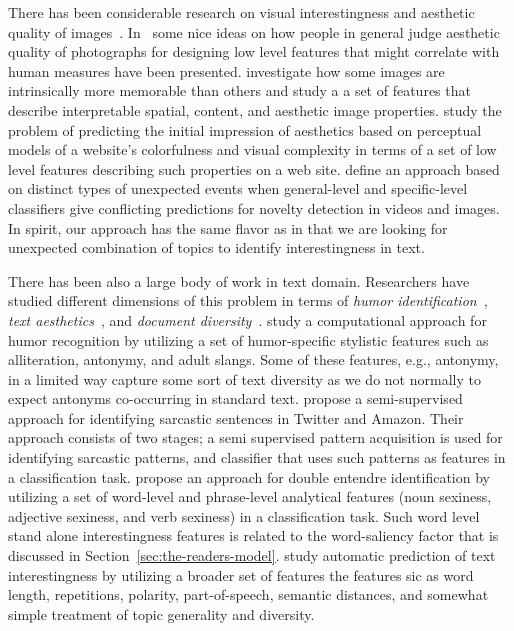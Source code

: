 There has been considerable research on visual interestingness and aesthetic quality of images~\cite{Datta:2006:SAP:2129560.2129588,Datta:2008:4233023,Ke:2006:DHF:1153170.1153495,IsolaParikhTorralbaOliva2011,dhar:2011,reinecke2013predicting,journals/pami/WeinshallZHKOABGNPHP12,journals/pami/WeinshallZHKOABGNPHP12}. In~\cite{Datta:2006:SAP:2129560.2129588,Datta:2008:4233023,Ke:2006:DHF:1153170.1153495,dhar:2011} some nice ideas on how people in general judge aesthetic quality of photographs for designing low level features that might correlate with human measures have been presented. \citep{IsolaParikhTorralbaOliva2011} investigate how some images are intrinsically more memorable than others and study a a set of features that describe interpretable spatial, content, and aesthetic image properties. \citep{reinecke2013predicting,journals/pami/WeinshallZHKOABGNPHP12}  study the problem of predicting the initial impression of aesthetics
based on perceptual models of a website's colorfulness and visual complexity in terms of a set of low level features describing such properties on a web site.  
\citep{journals/pami/WeinshallZHKOABGNPHP12} define an approach based on distinct types of unexpected events when general-level and specific-level classifiers give conflicting predictions for novelty detection in videos and images. In spirit, our approach has the same flavor as \cite{journals/pami/WeinshallZHKOABGNPHP12}  in that we are looking for unexpected combination of topics to identify interestingness in text.

 
There has been also a large body of work in text domain. Researchers have studied different dimensions of this problem in terms of {\em humor identification}~\cite{Mihalcea:2005:MCL:1220575.1220642,Davidov:2010:SRS:1870568.1870582,Kiddon11,labutov-lipson:2012:ACL2012short},
{\em text aesthetics}~\cite{journals:tamd:Schmidhuber10,N13-1118,ganguly:2014}, and {\em document diversity}~\cite{bache:2013}.  \citep{Mihalcea:2005:MCL:1220575.1220642} study a computational approach for humor recognition by utilizing a set of humor-specific stylistic features such as alliteration, antonymy, and adult slangs. Some of these features, e.g., antonymy, in a limited way capture some sort of text diversity as we do not normally to expect antonyms co-occurring in standard text. \citep{Davidov:2010:SRS:1870568.1870582}  propose a semi-supervised approach for identifying sarcastic sentences
in Twitter and Amazon.  Their approach consists of two stages; a semi supervised pattern acquisition is used for identifying
sarcastic patterns, and classifier that uses such patterns as features in a classification task. \citep{Kiddon11} propose an approach for double entendre identification by utilizing  a set of word-level and phrase-level analytical features (noun sexiness, adjective sexiness, and verb sexiness) in a classification task. Such word level stand alone interestingness features is related to the word-saliency factor that is discussed in Section~\ref{sec:the-readers-model}. \citep{ganguly:2014} study automatic prediction of text interestingness by utilizing a broader set of features the features sic as word length, repetitions, polarity, part-of-speech, semantic distances, and somewhat simple treatment of topic generality and diversity.


